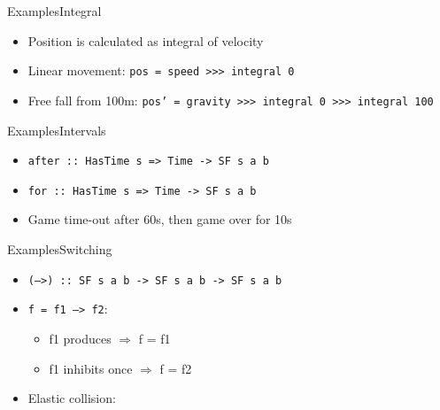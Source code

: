 \documentclass{beamer}
\begin{document}
    \begin{frame}{Examples}{Integral}
    \begin{itemize}
    \item Position is calculated as integral of velocity
\begin{figure}[ht]
\centering
{}
\end{figure}
\item Linear movement: \texttt{pos = speed >>> integral 0}
\item Free fall from 100m: \texttt{pos' = gravity >>> integral 0 >>> integral 100}
    \end{itemize}
    \end{frame}
\begin{frame}{Examples}{Intervals}
    \begin{itemize}
    \item \texttt{after :: HasTime s => Time -> SF s a b}
    \item \texttt{for :: HasTime s => Time -> SF s a b}
    \item Game time-out after 60s, then game over for 10s
    \end{itemize}    
\end{frame}

\begin{frame}[fragile]{Examples}{Switching}
    \begin{itemize}
    \item \texttt{(-->) :: SF s a b -> SF s a b -> SF s a b}
    \item \texttt{f = f1 --> f2}:
        \begin{itemize}
        \item f1 produces $\Rightarrow$ f = f1
        \item f1 inhibits once $\Rightarrow$ f = f2
        \end{itemize}
    \item Elastic collision:
    \end{itemize}
\end{frame}
    
\end{document}
